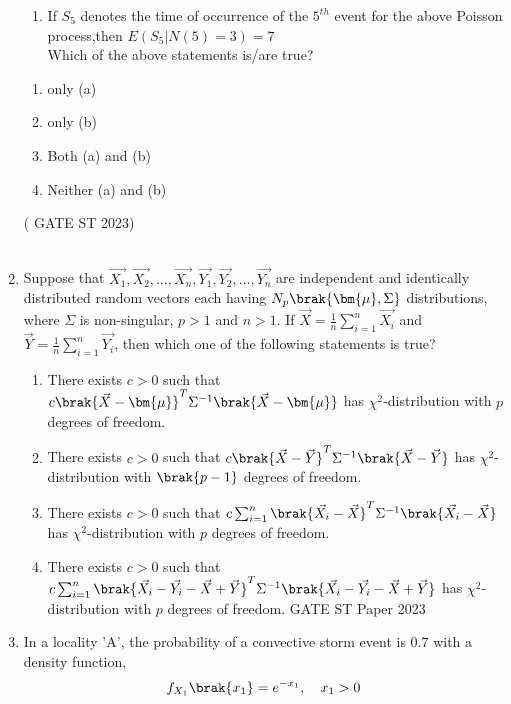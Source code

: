 \begin{enumerate}[label=\thechapter.\arabic*,ref=\thechapter.\theenumi]
\begin{enumerate}[label=(\alph*)]
\item If $S_5$ denotes the time of occurrence of the $5^{th}$ event for the above Poisson process,then $E(S_5|N(5)=3)=7$ \\
Which of the above statements is/are true?\\
\end{enumerate}
\begin{enumerate}[label=(\roman*)]
\item only (a)
\item only (b)
\item Both (a) and (b)
\item Neither (a) and (b)
\end{enumerate}
\hfill ( GATE ST 2023)\\
\solution \\

\item Suppose that $\vec{X_1}, \vec{X_2},\ldots, \vec{X_n}, \vec{Y_1}, \vec{Y_2},\ldots, \vec{Y_n}$ are independent and identically distributed random vectors each having $N_p\brak{\bm{\mu},\Sigma}$ distributions, where $\Sigma$ is non-singular, $p>1$ and $n>1$. If $\vec{X} = \frac{1}{n}\sum_{i=1}^{n}\vec{X_i}$ and $\vec{Y} = \frac{1}{n}\sum_{i=1}^{n}\vec{Y_i}$, then which one of the following statements is true?
\begin{enumerate}[label=(\alph*)]
\item There exists $c>0$ such that $c{\brak{\vec{X}-\bm{\mu}}}^T{\Sigma}^{-1}\brak{\vec{X}-\bm{\mu}}$ has ${\chi}^2$-distribution with $p$ degrees of freedom.
\item There exists $c>0$ such that $c{\brak{\vec{X}-\vec{Y}}^T}{\Sigma}^{-1}\brak{\vec{X}-\vec{Y}}$ has ${\chi}^2$-distribution with $\brak{p-1}$ degrees of freedom.
\item There exists $c>0$ such that $c\sum_{i=1}^n{\brak{\vec{X_i}-\vec{X}}}^T{\Sigma}^{-1}\brak{\vec{X_i}-\vec{X}}$ has ${\chi}^2$-distribution with $p$ degrees of freedom.
\item There exists $c>0$ such that $c\sum_{i=1}^n{\brak{\vec{X_i}-\vec{Y_i}-\vec{X}+\vec{Y}}}^T{\Sigma}^{-1}\brak{\vec{X_i}-\vec{Y_i}-\vec{X}+\vec{Y}}$ has ${\chi}^2$-distribution with $p$ degrees of freedom.   \hfill{GATE ST Paper 2023} 
\end{enumerate} 

\item In a locality 'A', the probability of a convective storm event is $0.7$ with a density function,
\begin{align}
f_{X_1}\brak{x_1} = e^{-x_1},\quad x_1>0

\end{align}
\end{enumerate}
